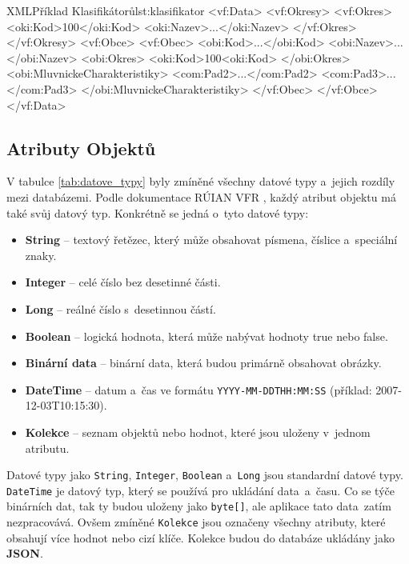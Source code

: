 \begin{code}{XML}{Příklad Klasifikátorů}{lst:klasifikator}
<vf:Data>
    <vf:Okresy>
        <vf:Okres>
            <oki:Kod>100</oki:Kod>
            <oki:Nazev>...</oki:Nazev>
        </vf:Okres>
    </vf:Okresy>
    <vf:Obce>
        <vf:Obec>
            <obi:Kod>...</obi:Kod>
            <obi:Nazev>...</obi:Nazev>
            <obi:Okres>
                <oki:Kod>100<oki:Kod>
            </obi:Okres>
            <obi:MluvnickeCharakteristiky>
                <com:Pad2>...</com:Pad2>
                <com:Pad3>...</com:Pad3>
            </obi:MluvnickeCharakteristiky>
        </vf:Obec>
    </vf:Obce>
</vf:Data>
\end{code}

\subsection{Atributy Objektů}
V tabulce \ref{tab:datove_typy} byly zmíněné všechny datové typy a~jejich rozdíly mezi databázemi.
Podle dokumentace RÚIAN VFR \cite{ruian_vfr}, každý atribut objektu má také svůj datový typ.
Konkrétně se jedná o~tyto datové typy:
\begin{itemize}
    \item \textbf{String} -- textový řetězec, který může obsahovat písmena, číslice a~speciální znaky.
    \item \textbf{Integer} -- celé číslo bez desetinné části.
    \item \textbf{Long} -- reálné číslo s~desetinnou částí.
    \item \textbf{Boolean} -- logická hodnota, která může nabývat hodnoty true nebo false.
    \item \textbf{Binární data} -- binární data, která budou primárně obsahovat obrázky.
    \item \textbf{DateTime} -- datum a~čas ve formátu \texttt{YYYY-MM-DDTHH:MM:SS} (příklad: 2007-12-03T10:15:30).
    \item \textbf{Kolekce} -- seznam objektů nebo hodnot, které jsou uloženy v~jednom atributu.
\end{itemize}

Datové typy jako \texttt{String}, \texttt{Integer}, \texttt{Boolean} a~\texttt{Long} jsou standardní datové typy.
\texttt{DateTime} je datový typ, který se používá pro ukládání data~a~času.
Co se týče binárních dat, tak ty budou uloženy jako \texttt{byte[]},
ale aplikace tato data~zatím nezpracovává.
Ovšem zmíněné \texttt{Kolekce} jsou označeny všechny atributy, které obsahují více hodnot nebo cizí klíče.
Kolekce budou do databáze ukládány jako \textbf{JSON}.

